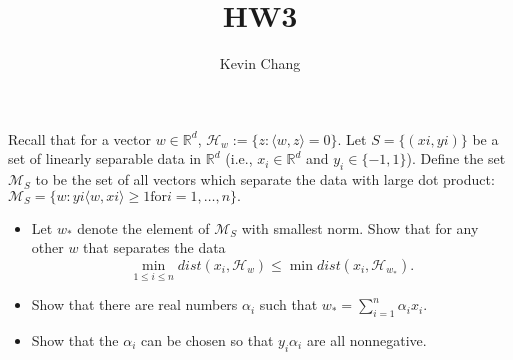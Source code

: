 \documentclass[a4paper]{article}
\title{HW3}
\author{Kevin Chang}
\begin{document}
\maketitle

\section{}
Recall that for a vector $w \in \mathbb{R}^d$, $\mathcal{H}_w := \{z : ⟨w, z⟩ = 0\}$.
Let $S = \{(xi , yi )\}$ be a set of linearly separable data in $\mathbb{R}^d$ (i.e., $x_i \in \mathbb{R}^d$ and $y_i \in \{-1, 1\}$).
Define the set $\mathcal{M}_S$ to be the set of all vectors which separate the data with large dot product:
$\mathcal{M}_S = \{w : yi ⟨w, xi ⟩ \geq 1 \text{for} i = 1, \dots , n\}.$
\begin{itemize}
    \item Let $w_*$ denote the element of $\mathcal{M}_S$ with smallest norm.
        Show that for any other $w$ that separates the data
        $$\min_{1 \leq i \leq n} \mathit{dist}(x_i , \mathcal{H}_w ) \leq \min \mathit{dist}(x_i , \mathcal{H}_{w_*}).$$
    \item Show that there are real numbers $\alpha_i$ such that $w_* = \sum_{i=1}^n \alpha_i x_i$.
    \item Show that the $\alpha_i$ can be chosen so that $y_i \alpha_i$ are all nonnegative.
\end{itemize}
\end{document}
